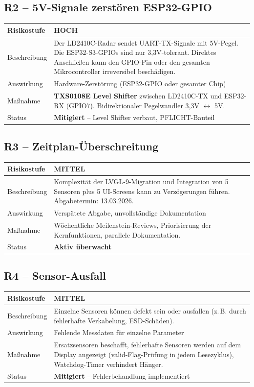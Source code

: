 \documentclass[a4paper,11pt]{article}
\begin{document}
\subsection{R2 -- 5V-Signale zerstören ESP32-GPIO}

\begin{tabularx}{\textwidth}{lX}
\toprule
\rowcolor{riskhigh}
\textbf{Risikostufe} & \textbf{HOCH} \\
\midrule
Beschreibung & Der LD2410C-Radar sendet UART-TX-Signale mit 5V-Pegel. Die ESP32-S3-GPIOs sind nur 3{,}3V-tolerant. Direktes Anschließen kann den GPIO-Pin oder den gesamten Mikrocontroller irreversibel beschädigen. \\
Auswirkung & Hardware-Zerstörung (ESP32-GPIO oder gesamter Chip) \\
Maßnahme & \textbf{TXS0108E Level Shifter} zwischen LD2410C-TX und ESP32-RX (GPIO7). Bidirektionaler Pegelwandler 3{,}3V $\leftrightarrow$ 5V. \\
Status & \textbf{Mitigiert} -- Level Shifter verbaut, PFLICHT-Bauteil \\
\bottomrule
\end{tabularx}

\subsection{R3 -- Zeitplan-Überschreitung}

\begin{tabularx}{\textwidth}{lX}
\toprule
\rowcolor{riskmedium}
\textbf{Risikostufe} & \textbf{MITTEL} \\
\midrule
Beschreibung & Komplexität der LVGL-9-Migration und Integration von 5 Sensoren plus 5 UI-Screens kann zu Verzögerungen führen. Abgabetermin: 13.03.2026. \\
Auswirkung & Verspätete Abgabe, unvollständige Dokumentation \\
Maßnahme & Wöchentliche Meilenstein-Reviews, Priorisierung der Kernfunktionen, parallele Dokumentation. \\
Status & \textbf{Aktiv überwacht} \\
\bottomrule
\end{tabularx}

\subsection{R4 -- Sensor-Ausfall}

\begin{tabularx}{\textwidth}{lX}
\toprule
\rowcolor{riskmedium}
\textbf{Risikostufe} & \textbf{MITTEL} \\
\midrule
Beschreibung & Einzelne Sensoren können defekt sein oder ausfallen (z.\,B. durch fehlerhafte Verkabelung, ESD-Schäden). \\
Auswirkung & Fehlende Messdaten für einzelne Parameter \\
Maßnahme & Ersatzsensoren beschafft, fehlerhafte Sensoren werden auf dem Display angezeigt (valid-Flag-Prüfung in jedem Lesezyklus), Watchdog-Timer verhindert Hänger. \\
Status & \textbf{Mitigiert} -- Fehlerbehandlung implementiert \\
\bottomrule
\end{tabularx}
\end{document}
